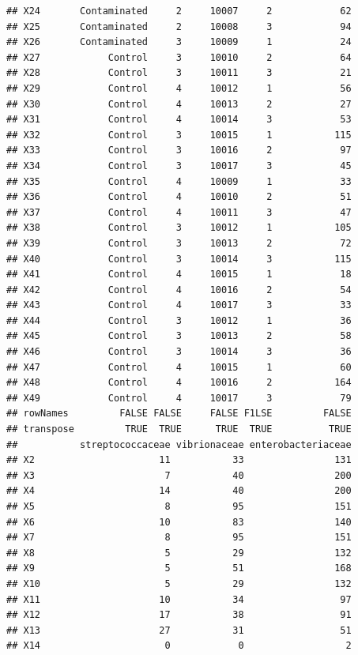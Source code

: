 \documentclass[10pt,handout,english]{beamer}\usepackage[]{graphicx}\usepackage[]{color}
\makeatletter
\newenvironment{kframe}{%
 \def\at@end@of@kframe{}%
 \ifinner\ifhmode%
  \def\at@end@of@kframe{\end{minipage}}%
  \begin{minipage}{\columnwidth}%
 \fi\fi%
 \def\FrameCommand##1{\hskip\@totalleftmargin \hskip-\fboxsep
 \colorbox{shadecolor}{##1}\hskip-\fboxsep
     \hskip-\linewidth \hskip-\@totalleftmargin \hskip\columnwidth}%
 \MakeFramed {\advance\hsize-\width
   \@totalleftmargin\z@ \linewidth\hsize
   \@setminipage}}%
 {\par\unskip\endMakeFramed%
 \at@end@of@kframe}
\newenvironment{knitrout}{}{} %
\makeatother
\begin{document}
\begin{frame}[fragile]
\begin{knitrout}
\begin{kframe}
\begin{verbatim}
## X24       Contaminated     2     10007     2            62
## X25       Contaminated     2     10008     3            94
## X26       Contaminated     3     10009     1            24
## X27            Control     3     10010     2            64
## X28            Control     3     10011     3            21
## X29            Control     4     10012     1            56
## X30            Control     4     10013     2            27
## X31            Control     4     10014     3            53
## X32            Control     3     10015     1           115
## X33            Control     3     10016     2            97
## X34            Control     3     10017     3            45
## X35            Control     4     10009     1            33
## X36            Control     4     10010     2            51
## X37            Control     4     10011     3            47
## X38            Control     3     10012     1           105
## X39            Control     3     10013     2            72
## X40            Control     3     10014     3           115
## X41            Control     4     10015     1            18
## X42            Control     4     10016     2            54
## X43            Control     4     10017     3            33
## X44            Control     3     10012     1            36
## X45            Control     3     10013     2            58
## X46            Control     3     10014     3            36
## X47            Control     4     10015     1            60
## X48            Control     4     10016     2           164
## X49            Control     4     10017     3            79
## rowNames         FALSE FALSE     FALSE F1LSE         FALSE
## transpose         TRUE  TRUE      TRUE  TRUE          TRUE
##           streptococcaceae vibrionaceae enterobacteriaceae
## X2                      11           33                131
## X3                       7           40                200
## X4                      14           40                200
## X5                       8           95                151
## X6                      10           83                140
## X7                       8           95                151
## X8                       5           29                132
## X9                       5           51                168
## X10                      5           29                132
## X11                     10           34                 97
## X12                     17           38                 91
## X13                     27           31                 51
## X14                      0            0                  2

\end{verbatim}
\end{kframe}
\end{knitrout}
\end{frame}
\end{document}
